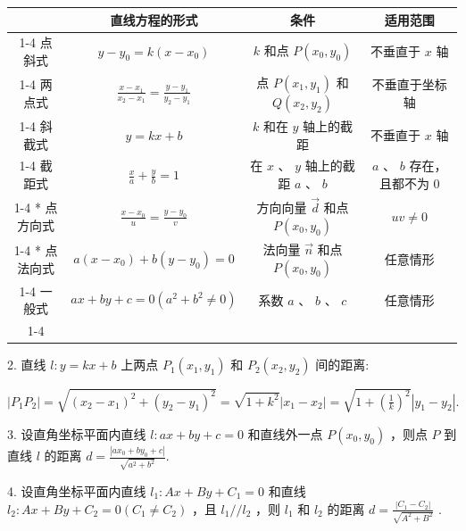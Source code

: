 \begin{center}
\begin{tabular}{|c|c|c|c|}
\hline
\phantom{X} & 直线方程的形式 & 条件 & 适用范围 \\
\cline{1-4}
点斜式 & $y - {y}_{0} = k\left( {x - {x}_{0}}\right)$ & $k$ 和点 $P\left( {{x}_{0},{y}_{0}}\right)$ & 不垂直于 $x$ 轴 \\
\cline{1-4}
两点式 & $\frac{x - {x}_{1}}{{x}_{2} - {x}_{1}} = \frac{y - {y}_{1}}{{y}_{2} - {y}_{1}}$ & 点 $P\left( {{x}_{1},{y}_{1}}\right)$ 和 $Q\left( {{x}_{2},{y}_{2}}\right)$ & 不垂直于坐标轴 \\
\cline{1-4}
斜截式 & $y = {kx} + b$ & $k$ 和在 $y$ 轴上的截距 & 不垂直于 $x$ 轴 \\
\cline{1-4}
截距式 & $\frac{x}{a} + \frac{y}{b} = 1$ & 在 $x\text{ 、 }y$ 轴上的截距 $a\text{ 、 }b$ & $a$ 、 $b$ 存在，且都不为 0 \\
\cline{1-4}
* 点方向式 & $\frac{x - {x}_{0}}{u} = \frac{y - {y}_{0}}{v}$ & 方向向量 $\overrightarrow{d}$ 和点 $P\left( {{x}_{0},{y}_{0}}\right)$ & ${uv} \neq  0$ \\
\cline{1-4}
* 点法向式 & $a\left( {x - {x}_{0}}\right)  + b\left( {y - {y}_{0}}\right)  = 0$ & 法向量 $\overrightarrow{n}$ 和点 $P\left( {{x}_{0},{y}_{0}}\right)$ & 任意情形 \\
\cline{1-4}
一般式 & ${ax} + {by} + c = 0\left( {{a}^{2} + {b}^{2} \neq  0}\right)$ & 系数 $a$ 、 $b$ 、 $c$ & 任意情形 \\
\cline{1-4}
\hline
\end{tabular}
\end{center}

2. 直线 $l : y = {kx} + b$ 上两点 ${P}_{1}\left( {{x}_{1},{y}_{1}}\right)$ 和 ${P}_{2}\left( {{x}_{2},{y}_{2}}\right)$ 间的距离:

$\left| {{P}_{1}{P}_{2}}\right|  = \sqrt{{\left( {x}_{2} - {x}_{1}\right) }^{2} + {\left( {y}_{2} - {y}_{1}\right) }^{2}} = \sqrt{1 + {k}^{2}}\left| {{x}_{1} - {x}_{2}}\right|  = \sqrt{1 + {\left( \frac{1}{k}\right) }^{2}}\left| {{y}_{1} - {y}_{2}}\right| .$

3. 设直角坐标平面内直线 $l : {ax} + {by} + c = 0$ 和直线外一点 $P\left( {{x}_{0},{y}_{0}}\right)$ ，则点 $P$ 到直线 $l$ 的距离 $d = \frac{\left| a{x}_{0} + b{y}_{0} + c\right| }{\sqrt{{a}^{2} + {b}^{2}}}.$

4. 设直角坐标平面内直线 ${l}_{1} : {Ax} + {By} + {C}_{1} = 0$ 和直线 ${l}_{2} : {Ax} + {By} + {C}_{2} = 0\left( {{C}_{1} \neq  {C}_{2}}\right)$ ，且 ${l}_{1}//{l}_{2}$ ，则 ${l}_{1}$ 和 ${l}_{2}$ 的距离 $d = \frac{\left| {C}_{1} - {C}_{2}\right| }{\sqrt{{A}^{2} + {B}^{2}}}$ .


